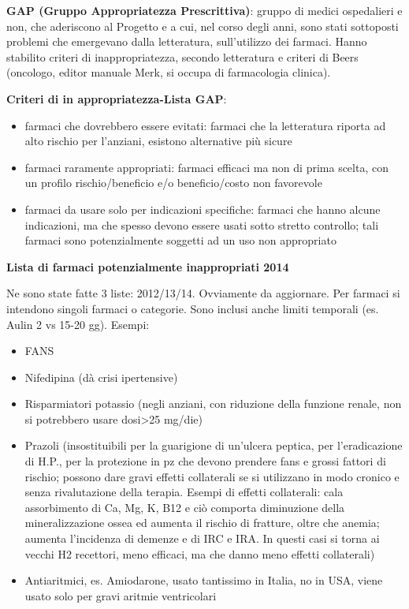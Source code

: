   \textbf{GAP (Gruppo Appropriatezza Prescrittiva)}: gruppo di medici
  ospedalieri e non, che aderiscono al Progetto e a cui, nel corso degli
  anni, sono stati sottoposti problemi che emergevano dalla letteratura,
  sull'utilizzo dei farmaci. Hanno stabilito criteri di
  inappropriatezza, secondo letteratura e criteri di Beers (oncologo,
  editor manuale Merk, si occupa di farmacologia clinica).

  \textbf{Criteri di in appropriatezza-Lista GAP}:

\begin{itemize}
\item
  farmaci che dovrebbero essere evitati: farmaci che la letteratura
  riporta ad alto rischio per l'anziani, esistono alternative più sicure
\item
  farmaci raramente appropriati: farmaci efficaci ma non di prima
  scelta, con un profilo rischio/beneficio e/o beneficio/costo non
  favorevole
\item
  farmaci da usare solo per indicazioni specifiche: farmaci che hanno
  alcune indicazioni, ma che spesso devono essere usati sotto stretto
  controllo; tali farmaci sono potenzialmente soggetti ad un uso non
  appropriato
\end{itemize}

  \textbf{Lista di farmaci potenzialmente inappropriati 2014}

  Ne sono state fatte 3 liste: 2012/13/14. Ovviamente da aggiornare. Per
  farmaci si intendono singoli farmaci o categorie. Sono inclusi anche
  limiti temporali (es. Aulin 2 vs 15-20 gg). Esempi:

\begin{itemize}
\item
  FANS
\item
  Nifedipina (dà crisi ipertensive)
\item
  Risparmiatori potassio (negli anziani, con riduzione della funzione
  renale, non si potrebbero usare dosi\textgreater{}25 mg/die)
\item
  Prazoli (insostituibili per la guarigione di un'ulcera peptica, per
  l'eradicazione di H.P., per la protezione in pz che devono prendere
  fans e grossi fattori di rischio; possono dare gravi effetti
  collaterali se si utilizzano in modo cronico e senza rivalutazione
  della terapia. Esempi di effetti collaterali: cala assorbimento di Ca,
  Mg, K, B12 e ciò comporta diminuzione della mineralizzazione ossea ed
  aumenta il rischio di fratture, oltre che anemia; aumenta l'incidenza
  di demenze e di IRC e IRA. In questi casi si torna ai vecchi H2
  recettori, meno efficaci, ma che danno meno effetti collaterali)
\item
  Antiaritmici, es. Amiodarone, usato tantissimo in Italia, no in USA,
  viene usato solo per gravi aritmie ventricolari
\end{itemize}

